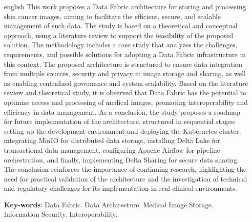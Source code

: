 \begin{resumo}[Abstract]
 \begin{otherlanguage*}{english}
    This work proposes a Data Fabric architecture for storing and processing skin cancer images, aiming to facilitate the efficient, secure, and scalable management of such data. The study is based on a theoretical and conceptual approach, using a literature review to support the feasibility of the proposed solution. The methodology includes a case study that analyzes the challenges, requirements, and possible solutions for adopting a Data Fabric infrastructure in this context. The proposed architecture is structured to ensure data integration from multiple sources, security and privacy in image storage and sharing, as well as enabling centralized governance and system scalability. Based on the literature review and theoretical study, it is observed that Data Fabric has the potential to optimize access and processing of medical images, promoting interoperability and efficiency in data management. As a conclusion, the study proposes a roadmap for future implementation of the architecture, structured in sequential stages: setting up the development environment and deploying the Kubernetes cluster, integrating MinIO for distributed data storage, installing Delta Lake for transactional data management, configuring Apache Airflow for pipeline orchestration, and finally, implementing Delta Sharing for secure data sharing. The conclusion reinforces the importance of continuing research, highlighting the need for practical validation of the architecture and the investigation of technical and regulatory challenges for its implementation in real clinical environments.

   \vspace{\onelineskip}
 
   \noindent 
   \textbf{Key-words}: Data Fabric. Data Architecture. Medical Image Storage. Information Security. Interoperability.
 \end{otherlanguage*}
\end{resumo}
